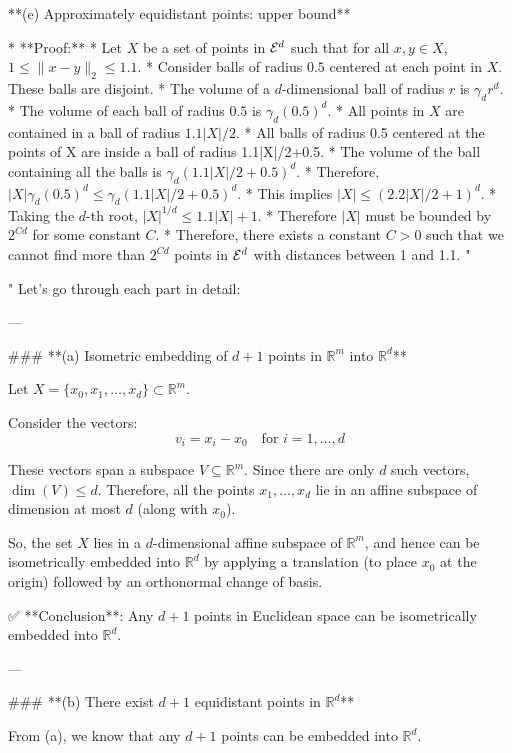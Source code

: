 \begin{enumerate}
\begin{shaded}
**(e) Approximately equidistant points: upper bound**

* **Proof:**
    * Let $X$ be a set of points in $\mathcal{E}^d$ such that for all $x, y \in X$, $1 \leq \|x - y\|_2 \leq 1.1$.
    * Consider balls of radius $0.5$ centered at each point in $X$. These balls are disjoint.
    * The volume of a $d$-dimensional ball of radius $r$ is $\gamma_d r^d$.
    * The volume of each ball of radius $0.5$ is $\gamma_d (0.5)^d$.
    * All points in $X$ are contained in a ball of radius $1.1|X|/2$.
    * All balls of radius 0.5 centered at the points of X are inside a ball of radius 1.1|X|/2+0.5.
    * The volume of the ball containing all the balls is $\gamma_d (1.1|X|/2+0.5)^d$.
    * Therefore, $|X| \gamma_d (0.5)^d \leq \gamma_d (1.1|X|/2+0.5)^d$.
    * This implies $|X| \leq (2.2|X|/2 + 1)^d$.
    * Taking the $d$-th root, $|X|^{1/d} \le 1.1|X|+1$.
    * Therefore $|X|$ must be bounded by $2^{Cd}$ for some constant $C$.
    * Therefore, there exists a constant $C > 0$ such that we cannot find more than $2^{Cd}$ points in $\mathcal{E}^d$ with distances between 1 and 1.1.
"

"
Let's go through each part in detail:

---

### **(a) Isometric embedding of \( d+1 \) points in \( \mathbb{R}^m \) into \( \mathbb{R}^d \)**

Let \( X = \{x_0, x_1, \dots, x_d\} \subset \mathbb{R}^m \).

Consider the vectors:
\[
v_i = x_i - x_0 \quad \text{for } i = 1, \dots, d
\]

These vectors span a subspace \( V \subseteq \mathbb{R}^m \). Since there are only \( d \) such vectors, \( \dim(V) \leq d \). Therefore, all the points \( x_1, \dots, x_d \) lie in an affine subspace of dimension at most \( d \) (along with \( x_0 \)).

So, the set \( X \) lies in a \( d \)-dimensional affine subspace of \( \mathbb{R}^m \), and hence can be isometrically embedded into \( \mathbb{R}^d \) by applying a translation (to place \( x_0 \) at the origin) followed by an orthonormal change of basis.

✅ **Conclusion**: Any \( d+1 \) points in Euclidean space can be isometrically embedded into \( \mathbb{R}^d \).

---

### **(b) There exist \( d+1 \) equidistant points in \( \mathbb{R}^d \)**

From (a), we know that any \( d+1 \) points can be embedded into \( \mathbb{R}^d \).


\end{shaded}
\end{enumerate}
